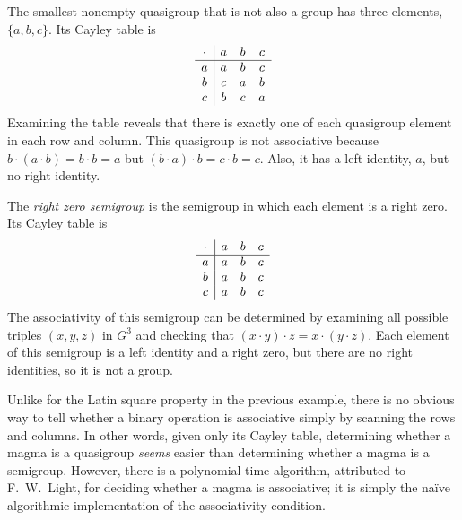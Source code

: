 \documentclass{article}
\begin{document}
\begin{example}\label{ex:quasigroup}
  The smallest nonempty quasigroup that is not also a group has three elements, $\{a, b, c\}$.
  Its Cayley table is
  \begin{equation*}
    \begin{array}{c | c c c}
      \cdot & a & b & c \\
      \hline
      a & a & b & c \\
      b & c & a & b \\
      c & b & c & a \\
    \end{array}
  \end{equation*}
  Examining the table reveals that there is exactly one of each quasigroup element in each row and column.
  This quasigroup is not associative because $b \cdot (a \cdot b) = b \cdot b = a$ but $(b \cdot a) \cdot b = c \cdot b = c$.
  Also, it has a left identity, $a$, but no right identity.
\end{example}

\begin{example}\label{ex:zero}
  The \emph{right zero semigroup} is the semigroup in which each element is a right zero.
  Its Cayley table is
  \begin{equation*}
    \begin{array}{c | c c c}
      \cdot & a & b & c \\
      \hline
      a & a & b & c \\
      b & a & b & c \\
      c & a & b & c \\
    \end{array}
  \end{equation*}
  The associativity of this semigroup can be determined by examining all possible triples $(x, y, z)$ in $G^3$ and checking that $(x \cdot y) \cdot z = x \cdot (y \cdot z)$.
  Each element of this semigroup is a left identity and a right zero, but there are no right identities, so it is not a group.

  Unlike for the Latin square property in the previous example, there is no obvious way to tell whether a binary operation is associative simply by scanning the rows and columns.
  In other words, given only its Cayley table, determining whether a magma is a quasigroup \emph{seems} easier than determining whether a magma is a semigroup.
  However, there is a polynomial time algorithm, attributed to F.~W.~Light, for deciding whether a magma is associative; it is simply the naïve algorithmic implementation of the associativity condition.
\end{example}
\end{document}
